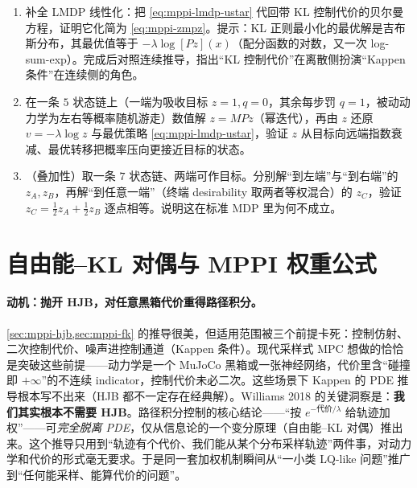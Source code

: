 \begin{practice}
\begin{enumerate}
  \item 补全 LMDP 线性化：把 \cref{eq:mppi-lmdp-ustar} 代回带 KL 控制代价的贝尔曼方程，证明它化简为 \cref{eq:mppi-zmpz}。提示：KL 正则最小化的最优解是吉布斯分布，其最优值等于 $-\lambda\log[Pz](x)$（配分函数的对数，又一次 log-sum-exp）。完成后对照连续推导，指出“KL 控制代价”在离散侧扮演“Kappen 条件”在连续侧的角色。
  \item 在一条 $5$ 状态链上（一端为吸收目标 $z=1,q=0$，其余每步罚 $q=1$，被动动力学为左右等概率随机游走）数值解 $z=MPz$（幂迭代），再由 $z$ 还原 $v=-\lambda\log z$ 与最优策略 \cref{eq:mppi-lmdp-ustar}，验证 $z$ 从目标向远端指数衰减、最优转移把概率压向更接近目标的状态。
  \item （叠加性）取一条 $7$ 状态链、两端可作目标。分别解“到左端”与“到右端”的 $z_A,z_B$，再解“到任意一端”（终端 desirability 取两者等权混合）的 $z_C$，验证 $z_C=\tfrac12 z_A+\tfrac12 z_B$ 逐点相等。说明这在标准 MDP 里为何不成立。
\end{enumerate}
\end{practice}

\section{自由能--KL 对偶与 MPPI 权重公式}
\label{sec:mppi-freeenergy}

\paragraph{动机：抛开 HJB，对任意黑箱代价重得路径积分。}
\cref{sec:mppi-hjb,sec:mppi-fk} 的推导很美，但适用范围被三个前提卡死：控制仿射、二次控制代价、噪声进控制通道（Kappen 条件）。现代采样式 MPC 想做的恰恰是突破这些前提——动力学是一个 MuJoCo 黑箱或一张神经网络，代价里含“碰撞即 $+\infty$”的不连续 indicator，控制代价未必二次。这些场景下 Kappen 的 PDE 推导根本写不出来（HJB 都不一定存在经典解）。Williams 2018 的关键洞察是：\textbf{我们其实根本不需要 HJB}\cite{williams2018information}。路径积分控制的核心结论——“按 $e^{-\text{代价}/\lambda}$ 给轨迹加权”——可\emph{完全脱离 PDE}，仅从信息论的一个变分原理（自由能--KL 对偶）推出来。这个推导只用到“轨迹有个代价、我们能从某个分布采样轨迹”两件事，对动力学和代价的形式毫无要求。于是同一套加权机制瞬间从“一小类 LQ-like 问题”推广到“任何能采样、能算代价的问题”。

